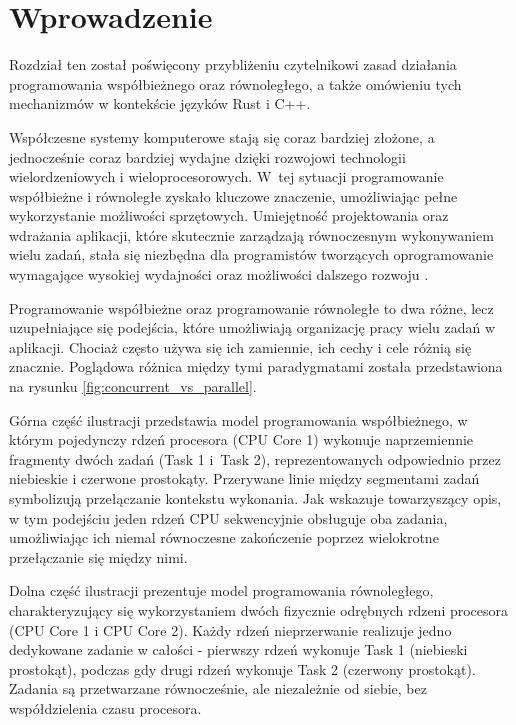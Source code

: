 \chapter{Wprowadzenie}
Rozdział ten został poświęcony przybliżeniu czytelnikowi zasad działania programowania współbieżnego oraz równoległego, a także omówieniu tych mechanizmów w kontekście języków Rust i C++.

Współczesne systemy komputerowe stają się coraz bardziej złożone, a jednocześnie coraz bardziej wydajne dzięki rozwojowi technologii wielordzeniowych i wieloprocesorowych. W~tej sytuacji programowanie współbieżne i równoległe zyskało kluczowe znaczenie, umożliwiając pełne wykorzystanie możliwości sprzętowych. Umiejętność projektowania oraz wdrażania aplikacji, które skutecznie zarządzają równoczesnym wykonywaniem wielu zadań, stała się niezbędna dla programistów tworzących oprogramowanie wymagające wysokiej wydajności oraz możliwości dalszego rozwoju \cite{IntroductionToConcurrencyAndParallelism, ConcurrencyInAction, ProgramminInOpenMp, ParallelProgramminginC++withOpenMP}.

Programowanie współbieżne  oraz programowanie równoległe  to dwa różne, lecz uzupełniające się podejścia, które umożliwiają organizację pracy wielu zadań w aplikacji. Chociaż często używa się ich zamiennie, ich cechy i cele różnią się znacznie. Poglądowa różnica między tymi paradygmatami została przedstawiona na rysunku \ref{fig:concurrent_vs_parallel}.

Górna część ilustracji przedstawia model programowania współbieżnego, w którym pojedynczy rdzeń procesora (CPU Core 1) wykonuje naprzemiennie fragmenty dwóch zadań (Task 1 i~Task 2), reprezentowanych odpowiednio przez niebieskie i czerwone prostokąty. Przerywane linie między segmentami zadań symbolizują przełączanie kontekstu wykonania. Jak wskazuje towarzyszący opis, w tym podejściu jeden rdzeń CPU sekwencyjnie obsługuje oba zadania, umożliwiając ich niemal równoczesne zakończenie poprzez wielokrotne przełączanie się między nimi.

Dolna część ilustracji prezentuje model programowania równoległego, charakteryzujący się wykorzystaniem dwóch fizycznie odrębnych rdzeni procesora (CPU Core 1 i CPU Core 2). Każdy rdzeń nieprzerwanie realizuje jedno dedykowane zadanie w całości - pierwszy rdzeń wykonuje Task 1 (niebieski prostokąt), podczas gdy drugi rdzeń wykonuje Task 2 (czerwony prostokąt). Zadania są przetwarzane równocześnie, ale niezależnie od siebie, bez współdzielenia czasu procesora.

